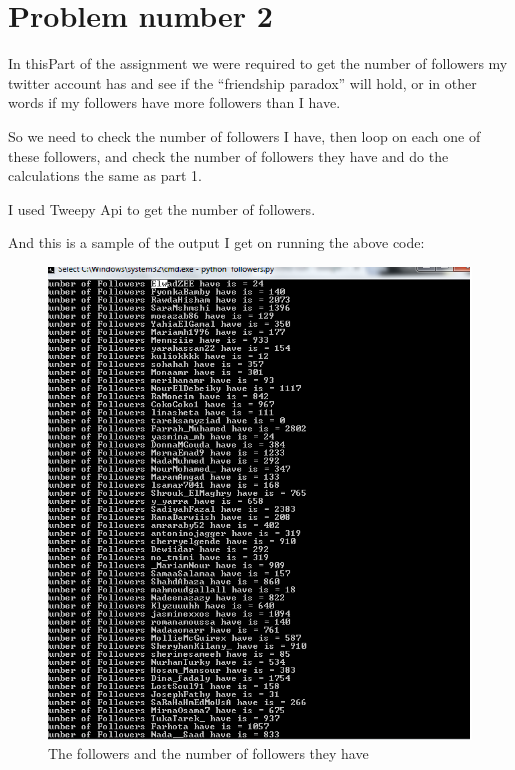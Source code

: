 \documentclass{article}
\begin{document}
\section{Problem number 2}
In thisPart of the assignment we were required to get the number of followers my twitter account has and see if the ``friendship paradox'' will hold, or in other words if my followers have more followers than I have.

So we need to check the number of followers I have, then loop on each one of these followers, and check the number of followers they have and do the calculations the same as part 1.

I used Tweepy Api to get the number of followers. 



And this is a sample of the output I get on running the above code:
\begin{figure}
\centering
\includegraphics[scale=0.95]{pic3.png}
\caption{The followers and the number of followers they have}
\label{fig:fig.png}
\end{figure}
\end{document}
